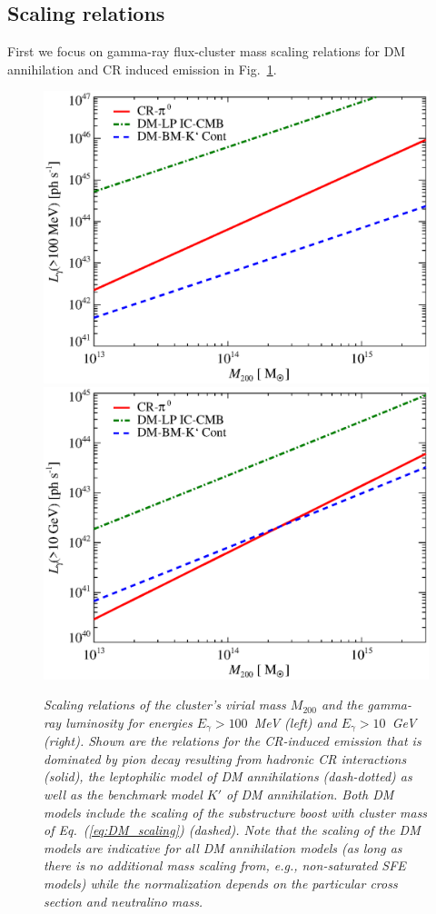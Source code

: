 \documentclass[10pt,aps,pra,reprint,amsmath,amsfonts,amssymb,showpacs,nofootinbib,floatfix]{revtex4-1}
\newcommand{\mvir}{M_{200}}
\begin{document}
\subsection{Scaling relations}
First we focus on gamma-ray flux-cluster mass scaling relations for DM
annihilation and CR induced emission in
Fig.~\ref{fig:lum_mass_scaling}.
\begin{figure}
  \includegraphics[width=0.99\columnwidth]{figures/MLscaling.100M.eps}
  \includegraphics[width=0.99\columnwidth]{figures/MLscaling.10G.eps}
  \caption{\it Scaling relations of the cluster's virial mass $\mvir$
    and the gamma-ray luminosity for energies $E_\gamma>100$~MeV
    (left) and $E_\gamma>10$~GeV (right). Shown are the relations for
    the CR-induced emission that is dominated by pion decay resulting
    from hadronic CR interactions (solid), the leptophilic model of DM
    annihilations (dash-dotted) as well as the benchmark model $K'$ of
    DM annihilation. Both DM models include the scaling of the
    substructure boost with cluster mass of Eq.~(\ref{eq:DM_scaling})
    (dashed). Note that the scaling of the DM models are indicative
    for all DM annihilation models (as long as there is no additional
    mass scaling from, e.g., non-saturated SFE models) while the
    normalization depends on the particular cross section and
    neutralino mass.}
\label{fig:lum_mass_scaling}
\end{figure}
\end{document}
